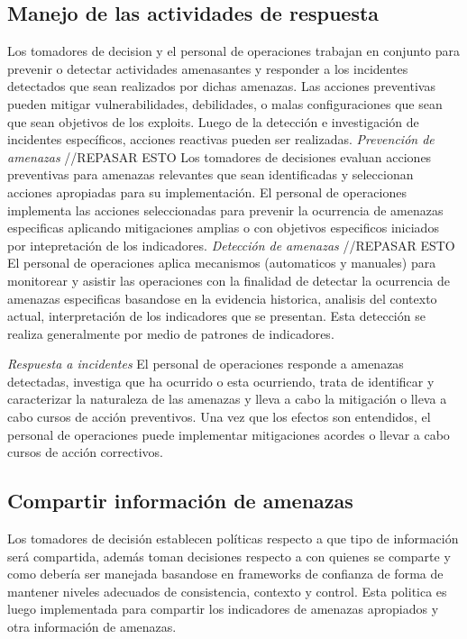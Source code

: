 \subsection{Manejo de las actividades de respuesta}
Los tomadores de decision y el personal de operaciones trabajan en conjunto para 
prevenir o detectar actividades amenasantes y responder a los incidentes 
detectados que sean realizados por dichas amenazas. Las acciones preventivas 
pueden mitigar vulnerabilidades, debilidades, o malas configuraciones que sean 
que sean objetivos de los exploits. Luego de la detección e investigación de 
incidentes específicos, acciones reactivas pueden ser realizadas.
\emph{Prevención de amenazas} //REPASAR ESTO
Los tomadores de decisiones evaluan acciones preventivas para amenazas 
relevantes que sean identificadas y seleccionan acciones apropiadas para su 
implementación. El personal de operaciones implementa las acciones seleccionadas 
para prevenir la ocurrencia de amenazas especificas aplicando mitigaciones 
amplias o con objetivos especificos iniciados por intepretación de los 
indicadores.
\emph{Detección de amenazas} //REPASAR ESTO
El personal de operaciones aplica mecanismos (automaticos y manuales) para 
monitorear y asistir las operaciones con la finalidad de detectar la ocurrencia 
de amenazas especificas basandose en la evidencia historica, analisis del 
contexto actual, interpretación de los indicadores que se presentan. Esta 
detección se realiza generalmente por medio de patrones de indicadores.

\emph{Respuesta a incidentes}
El personal de operaciones responde a amenazas detectadas, investiga que ha 
ocurrido o esta ocurriendo, trata de identificar y caracterizar la naturaleza de 
las amenazas y lleva a cabo la mitigación o lleva a cabo cursos de acción 
preventivos. Una vez que los efectos son entendidos, el personal de operaciones 
puede implementar mitigaciones acordes o llevar a cabo cursos de acción 
correctivos.

\subsection{Compartir información de amenazas}
Los tomadores de decisión establecen políticas respecto a que tipo de 
información será compartida, además toman decisiones respecto a con quienes se 
comparte y como debería ser manejada basandose en frameworks de confianza de 
forma de mantener niveles adecuados de consistencia, contexto y control. Esta 
politica es luego implementada para compartir los indicadores de amenazas 
apropiados y otra información de amenazas.

